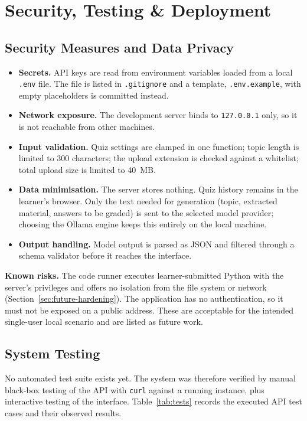 ﻿\chapter{Security, Testing \& Deployment}
\label{chap:security}

\section{Security Measures and Data Privacy}
\begin{itemize}
\item \textbf{Secrets.} API keys are read from environment variables loaded from a local \texttt{.env} file. The file is listed in \texttt{.gitignore} and a template, \texttt{.env.example}, with empty placeholders is committed instead.
\item \textbf{Network exposure.} The development server binds to \texttt{127.0.0.1} only, so it is not reachable from other machines.
\item \textbf{Input validation.} Quiz settings are clamped in one function; topic length is limited to 300 characters; the upload extension is checked against a whitelist; total upload size is limited to 40~MB.
\item \textbf{Data minimisation.} The server stores nothing. Quiz history remains in the learner's browser. Only the text needed for generation (topic, extracted material, answers to be graded) is sent to the selected model provider; choosing the Ollama engine keeps this entirely on the local machine.
\item \textbf{Output handling.} Model output is parsed as JSON and filtered through a schema validator before it reaches the interface.
\end{itemize}

\textbf{Known risks.} The code runner executes learner-submitted Python with the server's privileges and offers no isolation from the file system or network (Section~\ref{sec:future-hardening}). The application has no authentication, so it must not be exposed on a public address. These are acceptable for the intended single-user local scenario and are listed as future work.

\section{System Testing}
No automated test suite exists yet. The system was therefore verified by manual black-box testing of the API with \texttt{curl} against a running instance, plus interactive testing of the interface. Table~\ref{tab:tests} records the executed API test cases and their observed results.


